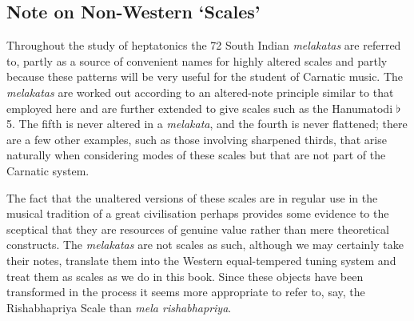 \documentclass[english]{./gbook}
\begin{document}
\begin{large}
\section*{Note on Non-Western `Scales'}

Throughout the study of heptatonics the 72 South Indian \emph{melakatas} are referred to, partly as a source of convenient names for highly altered scales and partly because these patterns will be very useful for the student of Carnatic music. The \emph{melakatas} are worked out according to an altered-note principle similar to that employed here and are further extended to give scales such as the Hanumatodi $\flat$5. The fifth is never altered in a \emph{melakata}, and the fourth is never flattened; there are a few other examples, such as those involving sharpened thirds, that arise naturally when considering modes of these scales but that are not part of the Carnatic system.

The fact that the unaltered versions of these scales are in regular use in the musical tradition of a great civilisation perhaps provides some evidence to the sceptical that they are resources of genuine value rather than mere theoretical constructs. The \emph{melakatas} are not scales as such, although we may certainly take their notes, translate them into the Western equal-tempered tuning system and treat them as scales as we do in this book. Since these objects have been transformed in the process it seems more appropriate to refer to, say, the Rishabhapriya Scale than \emph{mela rishabhapriya}.


\end{large}
\end{document}
